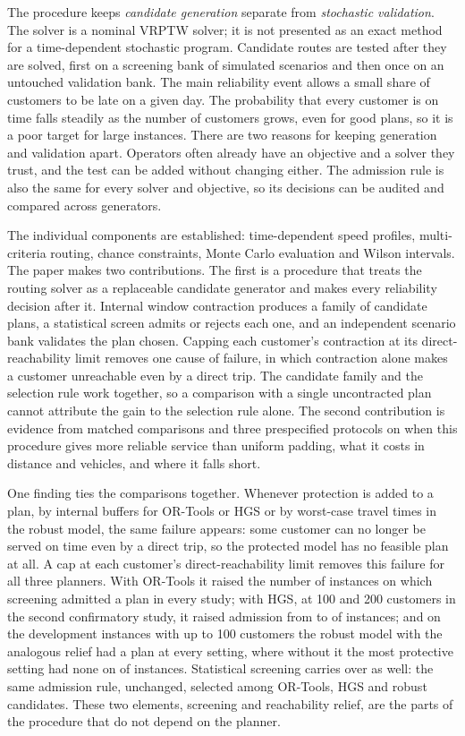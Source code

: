 \documentclass[11pt,a4paper]{article}
\begin{document}
The procedure keeps \emph{candidate generation} separate from \emph{stochastic
validation}. The solver is a nominal VRPTW solver; it is not presented as an
exact method for a time-dependent stochastic program. Candidate routes are tested
after they are solved, first on a screening bank of simulated scenarios and then
once on an untouched validation bank. The main reliability event allows a small
share of customers to be late on a given day. The probability that every customer
is on time falls steadily as the number of customers grows, even for good plans,
so it is a poor target for large instances. There are two reasons for keeping
generation and validation apart. Operators often already have an objective and a
solver they trust, and the test can be added without changing either. The
admission rule is also the same for every solver and objective, so its decisions
can be audited and compared across generators.

The individual components are established: time-dependent speed profiles,
multi-criteria routing, chance constraints, Monte Carlo evaluation and Wilson
intervals. The paper makes two contributions. The first is a procedure that
treats the routing solver as a replaceable candidate generator and makes every
reliability decision after it. Internal window contraction produces a family of
candidate plans, a statistical screen admits or rejects each one, and an
independent scenario bank validates the plan chosen. Capping each customer's
contraction at its direct-reachability limit removes one cause of failure, in
which contraction alone makes a customer unreachable even by a direct trip. The
candidate family and the selection rule work together, so a comparison with a
single uncontracted plan cannot attribute the gain to the selection rule alone.
The second contribution is evidence from matched comparisons and three
prespecified protocols on when this procedure gives more reliable
service than uniform padding, what it costs in distance and vehicles, and where
it falls short.

One finding ties the comparisons together. Whenever protection is added to a
plan, by internal buffers for OR-Tools or HGS or by worst-case travel times in
the robust model, the same failure appears: some customer can no longer be
served on time even by a direct trip, so the protected model has no feasible plan
at all. A cap at each customer's direct-reachability limit removes this failure
for all three planners. With OR-Tools it raised the number of instances on which
screening admitted a plan in every study; with HGS, at 100 and 200 customers in
the second confirmatory study, it raised admission from \CtwoHGSPAdmittedLarge{}
to \CtwoHGSKAdmittedLarge{} of \CtwoLarge{} instances; and on the development
instances with up to 100 customers the robust model with the analogous relief had
a plan at every setting, where without it the most protective setting had none
on \RobNoPlanBoxSix{} of \RobInstances{} instances. Statistical screening carries
over as well: the same admission rule, unchanged, selected among OR-Tools, HGS
and robust candidates. These two elements, screening and reachability relief, are
the parts of the procedure that do not depend on the planner.
\end{document}

